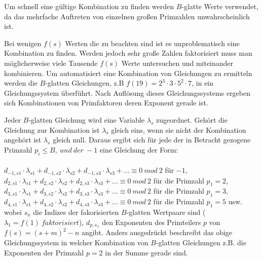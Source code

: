 \documentclass[10pt, bigheadings]{scrartcl}
\begin{document}
Um schnell eine gültige Kombination zu finden werden $B$-glatte Werte verwendet, da
das mehrfache Auftreten von einzelnen großen Primzahlen unwahrscheinlich ist.

Bei wenigen $f(s)$ Werten die zu beachten sind ist es unproblematisch eine
Kombination zu finden. Werden jedoch sehr große Zahlen faktorisiert muss
man möglicherweise viele Tausende $f(s)$ Werte untersuchen und miteinander
kombinieren. Um automatisiert eine Kombination von Gleichungen zu ermitteln
werden die $B$-glatten Gleichungen, z.B $f(19) = 2^3\cdot3\cdot5^2\cdot7$,
in ein Gleichungssystem überführt. Nach Auflösung dieses Gleichungssystems
ergeben sich Kombinationen von Primfaktoren deren Exponent gerade ist.

Jeder $B$-glatten Gleichung wird eine Variable $\lambda_s$ zugeordnet. Gehört
die Gleichung zur Kombination ist $\lambda_s$ gleich eins, wenn sie nicht
der Kombination angehört ist $\lambda_s$ gleich null. Daraus ergibt sich
für jede der in Betracht gezogene Primzahl $p_i \leq B,\ und\ der\ -1 $ eine
Gleichung der Form:\\\\
$d_{-1,s1}\cdot\lambda_{s1}+d_{-1,s2}\cdot\lambda_{s2}+d_{-1,s3}\cdot\lambda_{s3}+...\equiv 0\ mod\ 2$ für $-1$,\\
$d_{2,s1}\cdot\lambda_{s1}+d_{2,s2}\cdot\lambda_{s2}+d_{2,s3}\cdot\lambda_{s3}+...\equiv 0\ mod\ 2$ für die Primzahl $p_1 = 2$,\\
$d_{3,s1}\cdot\lambda_{s1}+d_{3,s2}\cdot\lambda_{s2}+d_{3,s3}\cdot\lambda_{s3}+...\equiv 0\ mod\ 2$ für die Primzahl $p_1 = 3$,\\
$d_{4,s1}\cdot\lambda_{s1}+d_{4,s2}\cdot\lambda_{s2}+d_{4,s3}\cdot\lambda_{s3}+...\equiv 0\ mod\ 2$ für die Primzahl $p_1 = 5$ usw.\\
wobei $s_x$ die Indizes der fakorisierten $B$-glatten Wertpaare sind
($\lambda_1 = f(1)\ faktorisiert$), $d_{p,s_x}$ den Exponenten des
Primteilers $p$ von $f(s) = (s+m)^2-n$ angibt. Anders
ausgedrückt beschreibt das obige Gleichungssystem in welcher Kombination
von $B$-glatten Gleichungen z.B. die Exponenten der Primzahl $p=2$ in der
Summe gerade sind.\\\\
\end{document}
